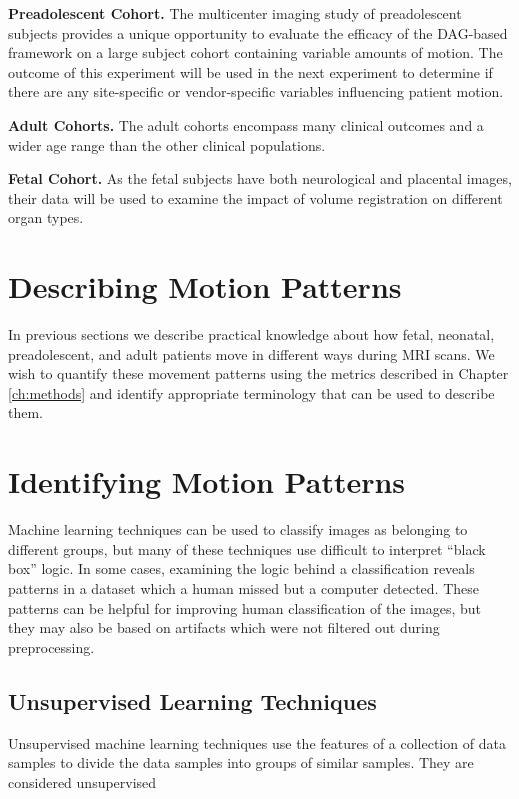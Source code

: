 \textbf{Preadolescent Cohort.} The multicenter imaging study of preadolescent subjects provides a unique opportunity to evaluate the efficacy of the DAG-based framework on a large subject cohort containing variable amounts of motion. The outcome of this experiment will be used in the next experiment to determine if there are any site-specific or vendor-specific variables influencing patient motion.

\textbf{Adult Cohorts.} The adult cohorts encompass many clinical outcomes and a wider age range than the other clinical populations. 

\textbf{Fetal Cohort.} As the fetal subjects have both neurological and placental images, their data will be used to examine the impact of volume registration on different organ types.

\section{Describing Motion Patterns}

In previous sections we describe practical knowledge about how fetal, neonatal, preadolescent, and adult patients move in different ways during MRI scans. We wish to quantify these movement patterns using the metrics described in Chapter \ref{ch:methods} and identify appropriate terminology that can be used to describe them.

\section{Identifying Motion Patterns}

Machine learning techniques can be used to classify images as belonging to different groups, but many of these techniques use difficult to interpret ``black box'' logic. In some cases, examining the logic behind a classification reveals patterns in a dataset which a human missed but a computer detected. These patterns can be helpful for improving human classification of the images, but they may also be based on artifacts which were not filtered out during preprocessing.

\subsection{Unsupervised Learning Techniques}

Unsupervised machine learning techniques use the features of a collection of data samples to divide the data samples into groups of similar samples. They are considered unsupervised 

